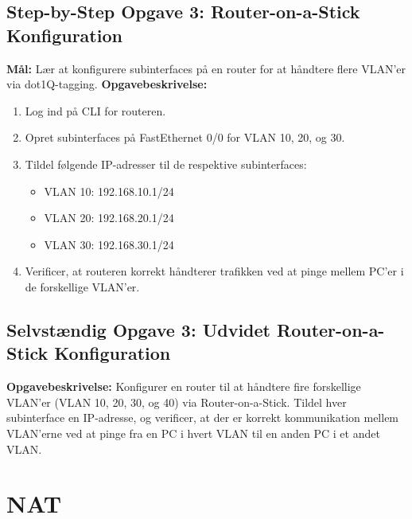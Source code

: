 \subsection*{Step-by-Step Opgave 3: Router-on-a-Stick Konfiguration}
\textbf{Mål:} Lær at konfigurere subinterfaces på en router for at håndtere flere VLAN'er via dot1Q-tagging.
\newline\newline\noindent
\textbf{Opgavebeskrivelse:}
\begin{enumerate}
	\item Log ind på CLI for routeren.
	\item Opret subinterfaces på FastEthernet 0/0 for VLAN 10, 20, og 30.
	\item Tildel følgende IP-adresser til de respektive subinterfaces:
	\begin{itemize}
		\item VLAN 10: 192.168.10.1/24
		\item VLAN 20: 192.168.20.1/24
		\item VLAN 30: 192.168.30.1/24
	\end{itemize}
	\item Verificer, at routeren korrekt håndterer trafikken ved at pinge mellem PC'er i de forskellige VLAN'er.
\end{enumerate}

\subsection*{Selvstændig Opgave 3: Udvidet Router-on-a-Stick Konfiguration}
\textbf{Opgavebeskrivelse:} Konfigurer en router til at håndtere fire forskellige VLAN'er (VLAN 10, 20, 30, og 40) via Router-on-a-Stick. Tildel hver subinterface en IP-adresse, og verificer, at der er korrekt kommunikation mellem VLAN'erne ved at pinge fra en PC i hvert VLAN til en anden PC i et andet VLAN.

\section{NAT}
